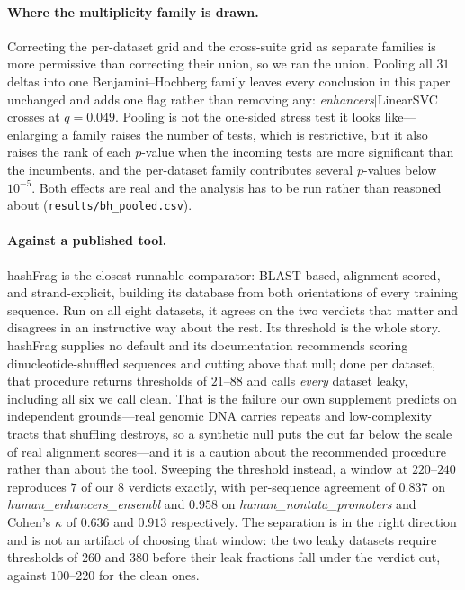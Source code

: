\documentclass[11pt,a4paper]{article}
\begin{document}
\paragraph{Where the multiplicity family is drawn.} Correcting the per-dataset grid and the cross-suite grid as separate families is more permissive than correcting their union, so we ran the union. Pooling all $31$ deltas into one Benjamini--Hochberg family leaves every conclusion in this paper unchanged and adds one flag rather than removing any: \textit{enhancers}$|$LinearSVC crosses at $q=0.049$. Pooling is not the one-sided stress test it looks like---enlarging a family raises the number of tests, which is restrictive, but it also raises the rank of each $p$-value when the incoming tests are more significant than the incumbents, and the per-dataset family contributes several $p$-values below $10^{-5}$. Both effects are real and the analysis has to be run rather than reasoned about (\texttt{results/bh\_pooled.csv}).

\paragraph{Against a published tool.} hashFrag \citep{rafi2026} is the closest runnable comparator: BLAST-based, alignment-scored, and strand-explicit, building its database from both orientations of every training sequence. Run on all eight datasets, it agrees on the two verdicts that matter and disagrees in an instructive way about the rest. Its threshold is the whole story. hashFrag supplies no default and its documentation recommends scoring dinucleotide-shuffled sequences and cutting above that null; done per dataset, that procedure returns thresholds of $21$--$88$ and calls \emph{every} dataset leaky, including all six we call clean. That is the failure our own supplement predicts on independent grounds---real genomic DNA carries repeats and low-complexity tracts that shuffling destroys, so a synthetic null puts the cut far below the scale of real alignment scores---and it is a caution about the recommended procedure rather than about the tool. Sweeping the threshold instead, a window at $220$--$240$ reproduces $7$ of our $8$ verdicts exactly, with per-sequence agreement of $0.837$ on \textit{human\_enhancers\_ensembl} and $0.958$ on \textit{human\_nontata\_promoters} and Cohen's $\kappa$ of $0.636$ and $0.913$ respectively. The separation is in the right direction and is not an artifact of choosing that window: the two leaky datasets require thresholds of $260$ and $380$ before their leak fractions fall under the verdict cut, against $100$--$220$ for the clean ones.
\end{document}
